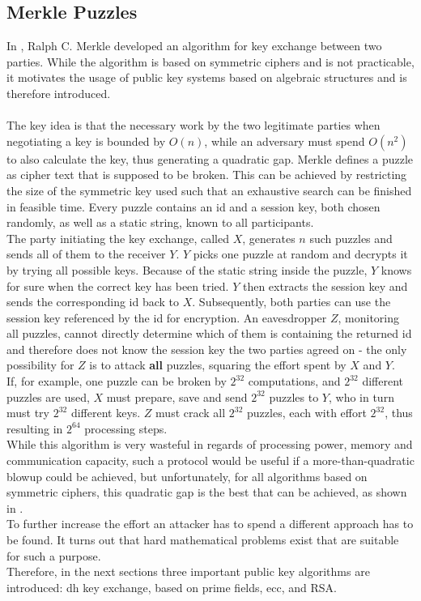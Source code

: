 \subsection{Merkle Puzzles}
In \cite{Merkle}, Ralph C. Merkle developed an algorithm for key exchange between two parties. While the algorithm is based on symmetric ciphers and is
not practicable, it motivates the usage of public key systems based on algebraic structures and is therefore introduced.
\\
\\
The key idea is that the necessary work by the two legitimate parties when negotiating a key is bounded by $O(n)$, while an adversary must spend $O(n^2)$ to 
also calculate the key, thus generating a quadratic gap. 
Merkle defines a puzzle as cipher text that is supposed to be broken. This can be achieved by restricting the size of the symmetric key used such that an
exhaustive search can be finished in feasible time. Every puzzle contains an id and a session key, both chosen randomly, as well as a static string,
known to all participants.
\\
The party initiating the key exchange, called $X$, generates $n$ such puzzles and sends all of them to the receiver $Y$. $Y$ picks one puzzle at random and
decrypts it by trying all possible keys. Because of the static string inside the puzzle, $Y$ knows for sure when the correct key has been tried.
$Y$ then extracts the session key and sends the corresponding id back to $X$. Subsequently, both parties can use the session key referenced by the id for encryption.
An eavesdropper $Z$, monitoring all puzzles, cannot directly determine which of them is containing the returned id and therefore does not know the session key the 
two parties agreed on - the only possibility for $Z$ is to attack \textbf{all} puzzles, squaring the effort spent by $X$ and $Y$.
\\
If, for example, one puzzle can be broken by $2^{32}$ computations, and $2^{32}$ different puzzles are used, $X$ must prepare, save and send $2^{32}$ puzzles
to $Y$, who in turn must try $2^{32}$ different keys. $Z$ must crack all $2^{32}$ puzzles, each with effort $2^{32}$, thus resulting in $2^{64}$ processing steps.
\\
While this algorithm is very wasteful in regards of processing power, memory and communication capacity, such a protocol would be useful if a more-than-quadratic
blowup could be achieved, but unfortunately, for all algorithms based on symmetric ciphers, this quadratic gap is the best that can be achieved,
as shown in \cite{Barak09merklepuzzles}.   
\\ 
To further increase the effort an attacker has to spend a different approach has to be found. It turns out that hard mathematical problems exist that are 
suitable for such a purpose. 
\\
Therefore, in the next sections three important public key algorithms are introduced: \gls{dh} key exchange, based on prime fields, \gls{ecc}, and RSA.
